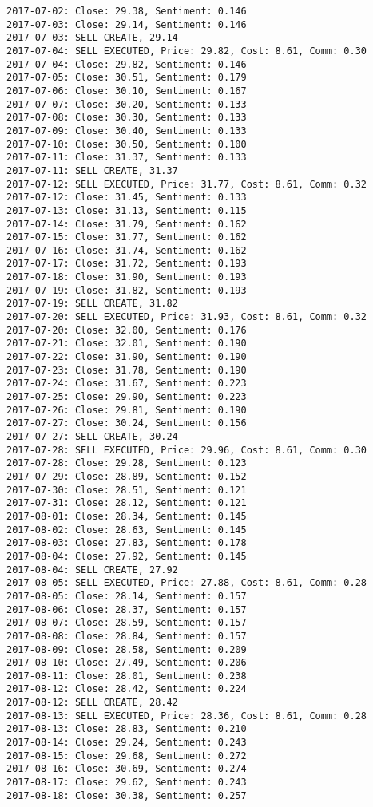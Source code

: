 \documentclass[11pt]{article}
\begin{document}
\begin{Verbatim}[commandchars=\\\{\}]
2017-07-02: Close: 29.38, Sentiment: 0.146
2017-07-03: Close: 29.14, Sentiment: 0.146
2017-07-03: SELL CREATE, 29.14
2017-07-04: SELL EXECUTED, Price: 29.82, Cost: 8.61, Comm: 0.30
2017-07-04: Close: 29.82, Sentiment: 0.146
2017-07-05: Close: 30.51, Sentiment: 0.179
2017-07-06: Close: 30.10, Sentiment: 0.167
2017-07-07: Close: 30.20, Sentiment: 0.133
2017-07-08: Close: 30.30, Sentiment: 0.133
2017-07-09: Close: 30.40, Sentiment: 0.133
2017-07-10: Close: 30.50, Sentiment: 0.100
2017-07-11: Close: 31.37, Sentiment: 0.133
2017-07-11: SELL CREATE, 31.37
2017-07-12: SELL EXECUTED, Price: 31.77, Cost: 8.61, Comm: 0.32
2017-07-12: Close: 31.45, Sentiment: 0.133
2017-07-13: Close: 31.13, Sentiment: 0.115
2017-07-14: Close: 31.79, Sentiment: 0.162
2017-07-15: Close: 31.77, Sentiment: 0.162
2017-07-16: Close: 31.74, Sentiment: 0.162
2017-07-17: Close: 31.72, Sentiment: 0.193
2017-07-18: Close: 31.90, Sentiment: 0.193
2017-07-19: Close: 31.82, Sentiment: 0.193
2017-07-19: SELL CREATE, 31.82
2017-07-20: SELL EXECUTED, Price: 31.93, Cost: 8.61, Comm: 0.32
2017-07-20: Close: 32.00, Sentiment: 0.176
2017-07-21: Close: 32.01, Sentiment: 0.190
2017-07-22: Close: 31.90, Sentiment: 0.190
2017-07-23: Close: 31.78, Sentiment: 0.190
2017-07-24: Close: 31.67, Sentiment: 0.223
2017-07-25: Close: 29.90, Sentiment: 0.223
2017-07-26: Close: 29.81, Sentiment: 0.190
2017-07-27: Close: 30.24, Sentiment: 0.156
2017-07-27: SELL CREATE, 30.24
2017-07-28: SELL EXECUTED, Price: 29.96, Cost: 8.61, Comm: 0.30
2017-07-28: Close: 29.28, Sentiment: 0.123
2017-07-29: Close: 28.89, Sentiment: 0.152
2017-07-30: Close: 28.51, Sentiment: 0.121
2017-07-31: Close: 28.12, Sentiment: 0.121
2017-08-01: Close: 28.34, Sentiment: 0.145
2017-08-02: Close: 28.63, Sentiment: 0.145
2017-08-03: Close: 27.83, Sentiment: 0.178
2017-08-04: Close: 27.92, Sentiment: 0.145
2017-08-04: SELL CREATE, 27.92
2017-08-05: SELL EXECUTED, Price: 27.88, Cost: 8.61, Comm: 0.28
2017-08-05: Close: 28.14, Sentiment: 0.157
2017-08-06: Close: 28.37, Sentiment: 0.157
2017-08-07: Close: 28.59, Sentiment: 0.157
2017-08-08: Close: 28.84, Sentiment: 0.157
2017-08-09: Close: 28.58, Sentiment: 0.209
2017-08-10: Close: 27.49, Sentiment: 0.206
2017-08-11: Close: 28.01, Sentiment: 0.238
2017-08-12: Close: 28.42, Sentiment: 0.224
2017-08-12: SELL CREATE, 28.42
2017-08-13: SELL EXECUTED, Price: 28.36, Cost: 8.61, Comm: 0.28
2017-08-13: Close: 28.83, Sentiment: 0.210
2017-08-14: Close: 29.24, Sentiment: 0.243
2017-08-15: Close: 29.68, Sentiment: 0.272
2017-08-16: Close: 30.69, Sentiment: 0.274
2017-08-17: Close: 29.62, Sentiment: 0.243
2017-08-18: Close: 30.38, Sentiment: 0.257

\end{Verbatim}
\end{document}

